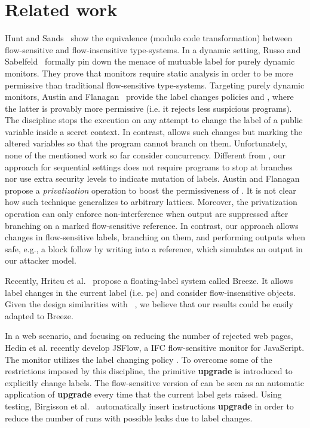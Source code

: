 \section{Related work}

Hunt and Sands~\citep{Hunt:2006} show the equivalence (modulo code
transformation) between flow-sensitive and flow-insensitive type-systems. In a
dynamic setting, Russo and Sabelfeld~\citep{Russo:2010} formally pin down the
menace of mutuable label for purely dynamic monitors. They prove that monitors
require static analysis in order to be more permissive than traditional
flow-sensitive type-systems. Targeting purely dynamic monitors, Austin and
Flanagan~\citep{Austin:Flanagan:PLAS10} provide the label changes policies
\emph{\nsu} and \emph{\pu}, where the latter is provably more permissive
(i.e. it rejects less suspicious programs). The discipline {\nsu} stops the
execution on any attempt to change the label of a public variable inside a
secret context. In contrast, {\pu} allows such changes but marking the altered
variables so that the program cannot branch on them. Unfortunately, none of the
mentioned work so far consider concurrency. Different from {\pu}, our approach
for sequential settings does not require programs to stop at branches nor use
extra security levels to indicate mutation of labels. Austin and Flanagan
propose a \emph{privatization} operation to boost the permissiveness of {\pu}.
It is not clear how such technique generalizes to arbitrary lattices. Moreover,
the privatization operation can only enforce non-interference when output are
suppressed after branching on a marked flow-sensitive reference. In contrast,
our approach allows changes in flow-sensitive labels, branching on them, and
performing outputs when safe, e.g., a {\toLabeledWith} block follow by writing 
into a reference, which simulates an output in our attacker model. 

Recently, Hritcu et al.~\citep{10.1109/SP.2013.10} propose a floating-label
system called Breeze. It allows label changes in the current label (i.e. pc) and
consider flow-insensitive objects. Given the design similarities with
\LIO~\citep{stefan:lio}, we believe that our results could be easily adapted to
Breeze.

In a web scenario, and focusing on reducing the number of rejected web pages,
Hedin et al. \citep{Hedin13} recently develop JSFlow, a IFC flow-sensitive
monitor for JavaScript. The monitor utilizes the label changing policy
{\nsu}. To overcome some of the restrictions imposed by this discipline, the
primitive \textbf{upgrade} is introduced to explicitly change labels. The
flow-sensitive version of {\forkLIO} can be seen as an automatic application of
\textbf{upgrade} every time that the current label gets raised. Using testing,
Birgisson et al.~\citep{Arnar2012} automatically insert instructions
\textbf{upgrade} in order to reduce the number of runs with possible leaks due
to label changes.



